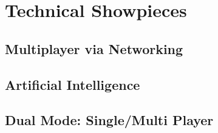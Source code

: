 \documentclass[letterpaper,11pt,twoside]{article}
\begin{document}
\section{Technical Showpieces}

\subsection{Multiplayer via Networking}

\subsection{Artificial Intelligence}

\subsection{Dual Mode: Single/Multi Player}
\end{document}
